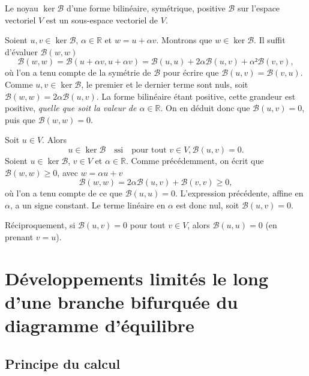 \documentclass[12pt, final]{amsart}
\begin{document}
Le noyau \(\ker\mathcal B\) d'une forme bilinéaire, symétrique, positive \(\mathcal B\) sur
l'espace vectoriel \(V\) est un sous-espace vectoriel de \(V\).


  Soient \(u, v\in\ker\mathcal B\), \(\alpha\in\mathbb R \) et \(w=u+\alpha v\). Montrons que \(w\in\ker\mathcal B\). Il
  suffit d'évaluer \(\mathcal B(w, w)\)
  \begin{equation}
    \mathcal B(w, w)=\mathcal B(u+\alpha v, u+\alpha v)=\mathcal B(u, u)+2\alpha\mathcal B(u, v)+\alpha²\mathcal B(v, v),
  \end{equation}
  où l'on a tenu compte de la symétrie de \(\mathcal B\) pour écrire que
  \(\mathcal B(u, v)=\mathcal B(v, u)\). Comme \(u, v\in\ker\mathcal B\), le premier et le dernier terme
  sont nuls, soit \(\mathcal B(w, w)=2\alpha\mathcal B(u, v)\). La forme bilinéaire étant positive,
  cette grandeur est positive, \emph{quelle que soit la valeur de \(\alpha\in\mathbb R \)}. On
  en déduit donc que \(\mathcal B(u, v)=0\), puis que \(\mathcal B(w, w)=0\).

Soit \(u\in V\). Alors
\begin{equation}
  u\in\ker\mathcal B\quad\text{ssi}\quad\text{pour tout }v\in V, \mathcal B(u, v)=0.
\end{equation}
  Soient \(u\in\ker\mathcal B\), \(v\in V\) et \(\alpha\in\mathbb R \). Comme précédemment, on écrit que
  \(\mathcal B(w, w)\geq0\), avec \(w=\alpha u+v\)
  \begin{equation}
    \mathcal B(w, w)=2\alpha\mathcal B(u, v)+\mathcal B(v, v)\geq0,
  \end{equation}
  où l'on a tenu compte de ce que \(\mathcal B(u, u)=0\). L'expression précédente,
  affine en \(\alpha\), a un signe constant. Le terme linéaire en \(\alpha\) est donc
  nul, soit \(\mathcal B(u, v)=0\).

  Réciproquement, si \(\mathcal B(u, v)=0\) pour tout \(v\in V\), alors \(\mathcal B(u, u)=0\) (en
  prenant \(v=u\)).

\section{Développements limités le long d'une branche bifurquée du diagramme
  d'équilibre}

\subsection{Principe du calcul}
\label{sec:20220107121442}
\end{document}
